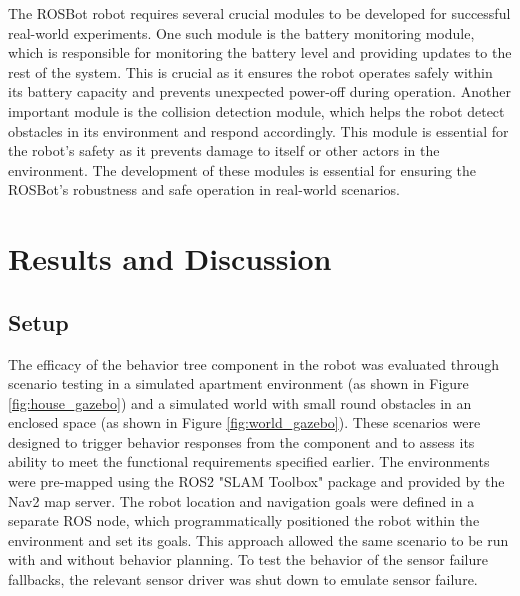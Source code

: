 \documentclass[letterpaper, 10pt, conference]{ieeeconf}
\begin{document}
The ROSBot robot requires several crucial modules to be developed for successful real-world experiments. One such module is the battery monitoring module, which is responsible for monitoring the battery level and providing updates to the rest of the system. This is crucial as it ensures the robot operates safely within its battery capacity and prevents unexpected power-off during operation. Another important module is the collision detection module, which helps the robot detect obstacles in its environment and respond accordingly. This module is essential for the robot's safety as it prevents damage to itself or other actors in the environment. The development of these modules is essential for ensuring the ROSBot's robustness and safe operation in real-world scenarios.


\section{Results and Discussion}
\label{sec:ResultsAndDiscussion}

\subsection{Setup}

The efficacy of the behavior tree component in the robot was evaluated through scenario testing in a simulated apartment environment (as shown in Figure \ref{fig:house_gazebo}) and a simulated world with small round obstacles in an enclosed space (as shown in Figure \ref{fig:world_gazebo}). These scenarios were designed to trigger behavior responses from the component and to assess its ability to meet the functional requirements specified earlier. The environments were pre-mapped using the ROS2 "SLAM Toolbox" package and provided by the Nav2 map server. The robot location and navigation goals were defined in a separate ROS node, which programmatically positioned the robot within the environment and set its goals. This approach allowed the same scenario to be run with and without behavior planning. To test the behavior of the sensor failure fallbacks, the relevant sensor driver was shut down to emulate sensor failure.
\end{document}
